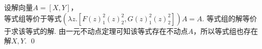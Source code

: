 \begin{pf} \rm 
    设解向量$A=[X, Y]$，\\
    等式组等价于等式$(\lambda z.[F(z)_1^2 (z)_2^2, G(z)_1^2 (z)_2^2]) A = A$. 等式组的解等价于求该等式的解. 由一元不动点定理可知该等式存在不动点$A$，所以等式组也存在解$X, Y$.
    \qed
\end{pf}